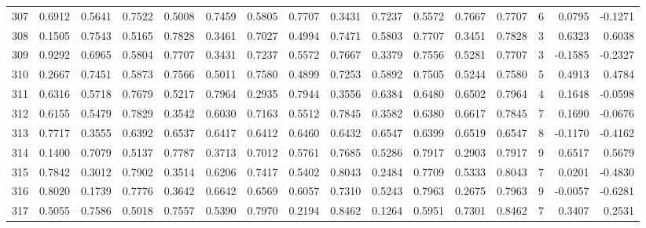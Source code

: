 \begin{tabular}{lrrrrrrrrrrrrrrr}
307 &      0.6912 &  0.5641 &  0.7522 &  0.5008 &  0.7459 &  0.5805 &  0.7707 &  0.3431 &  0.7237 &  0.5572 &   0.7667 &     0.7707 &      6 &                    0.0795 &                    -0.1271 \\
308 &      0.1505 &  0.7543 &  0.5165 &  0.7828 &  0.3461 &  0.7027 &  0.4994 &  0.7471 &  0.5803 &  0.7707 &   0.3451 &     0.7828 &      3 &                    0.6323 &                     0.6038 \\
309 &      0.9292 &  0.6965 &  0.5804 &  0.7707 &  0.3431 &  0.7237 &  0.5572 &  0.7667 &  0.3379 &  0.7556 &   0.5281 &     0.7707 &      3 &                   -0.1585 &                    -0.2327 \\
310 &      0.2667 &  0.7451 &  0.5873 &  0.7566 &  0.5011 &  0.7580 &  0.4899 &  0.7253 &  0.5892 &  0.7505 &   0.5244 &     0.7580 &      5 &                    0.4913 &                     0.4784 \\
311 &      0.6316 &  0.5718 &  0.7679 &  0.5217 &  0.7964 &  0.2935 &  0.7944 &  0.3556 &  0.6384 &  0.6480 &   0.6502 &     0.7964 &      4 &                    0.1648 &                    -0.0598 \\
312 &      0.6155 &  0.5479 &  0.7829 &  0.3542 &  0.6030 &  0.7163 &  0.5512 &  0.7845 &  0.3582 &  0.6380 &   0.6617 &     0.7845 &      7 &                    0.1690 &                    -0.0676 \\
313 &      0.7717 &  0.3555 &  0.6392 &  0.6537 &  0.6417 &  0.6412 &  0.6460 &  0.6432 &  0.6547 &  0.6399 &   0.6519 &     0.6547 &      8 &                   -0.1170 &                    -0.4162 \\
314 &      0.1400 &  0.7079 &  0.5137 &  0.7787 &  0.3713 &  0.7012 &  0.5761 &  0.7685 &  0.5286 &  0.7917 &   0.2903 &     0.7917 &      9 &                    0.6517 &                     0.5679 \\
315 &      0.7842 &  0.3012 &  0.7902 &  0.3514 &  0.6206 &  0.7417 &  0.5402 &  0.8043 &  0.2484 &  0.7709 &   0.5333 &     0.8043 &      7 &                    0.0201 &                    -0.4830 \\
316 &      0.8020 &  0.1739 &  0.7776 &  0.3642 &  0.6642 &  0.6569 &  0.6057 &  0.7310 &  0.5243 &  0.7963 &   0.2675 &     0.7963 &      9 &                   -0.0057 &                    -0.6281 \\
317 &      0.5055 &  0.7586 &  0.5018 &  0.7557 &  0.5390 &  0.7970 &  0.2194 &  0.8462 &  0.1264 &  0.5951 &   0.7301 &     0.8462 &      7 &                    0.3407 &                     0.2531 \\

\end{tabular}
